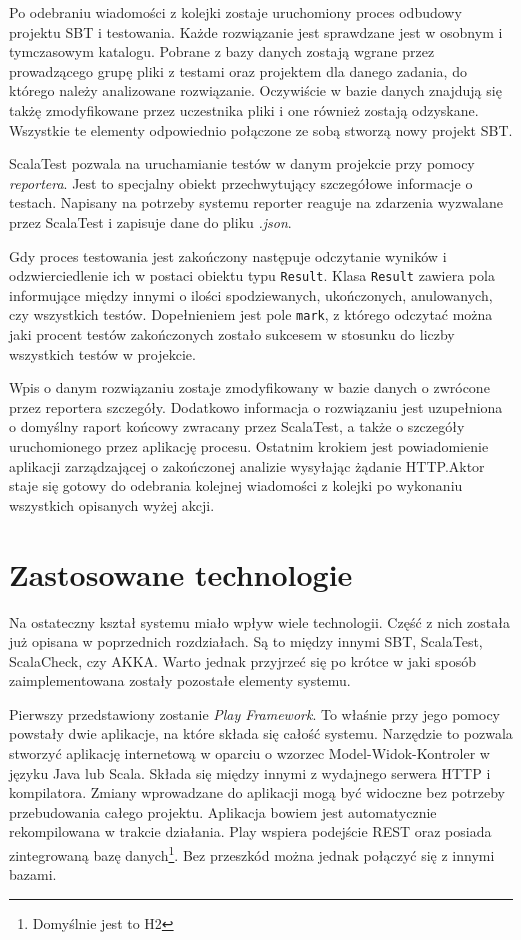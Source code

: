 \documentclass[brudnopis]{xmgr}
\begin{document}
Po odebraniu wiadomości z kolejki zostaje uruchomiony proces odbudowy projektu SBT i testowania. Każde rozwiązanie jest sprawdzane jest w osobnym i tymczasowym katalogu. Pobrane z bazy danych zostają wgrane przez prowadzącego grupę pliki z testami oraz projektem dla danego zadania, do którego należy analizowane rozwiązanie. Oczywiście w bazie danych znajdują się takżę zmodyfikowane przez uczestnika pliki i one również zostają odzyskane. Wszystkie te elementy odpowiednio połączone ze sobą stworzą nowy projekt SBT. 

ScalaTest pozwala na uruchamianie testów w danym projekcie przy pomocy \emph{reportera}. Jest to specjalny obiekt przechwytujący szczegółowe informacje o testach. Napisany na potrzeby systemu reporter reaguje na zdarzenia wyzwalane przez ScalaTest i zapisuje dane do pliku \emph{.json}. 

Gdy proces testowania jest zakończony następuje odczytanie wyników i odzwierciedlenie ich w postaci obiektu typu \texttt{Result}. Klasa \texttt{Result} zawiera pola informujące między innymi o ilości spodziewanych, ukończonych, anulowanych, czy wszystkich testów. Dopełnieniem jest pole \texttt{mark}, z którego odczytać można jaki procent testów zakończonych zostało sukcesem w stosunku do liczby wszystkich testów w projekcie. 

Wpis o danym rozwiązaniu zostaje zmodyfikowany w bazie danych o zwrócone przez reportera szczegóły. Dodatkowo informacja o rozwiązaniu jest uzupełniona o domyślny raport końcowy zwracany przez ScalaTest, a także o szczegóły uruchomionego przez aplikację procesu. Ostatnim krokiem jest powiadomienie aplikacji zarządzającej o zakończonej analizie wysyłając żądanie HTTP.Aktor staje się gotowy do odebrania kolejnej wiadomości z kolejki po wykonaniu wszystkich opisanych wyżej akcji.

\section{Zastosowane technologie}

Na ostateczny kształ systemu miało wpływ wiele technologii. Część z nich została już opisana w poprzednich rozdziałach. Są to między innymi SBT, ScalaTest, ScalaCheck, czy AKKA. Warto jednak przyjrzeć się po krótce w jaki sposób zaimplementowana zostały pozostałe elementy systemu. 

Pierwszy przedstawiony zostanie \emph{Play Framework}. To właśnie przy jego pomocy powstały dwie aplikacje, na które składa się całość systemu. Narzędzie to pozwala stworzyć aplikację internetową w oparciu o wzorzec Model-Widok-Kontroler w języku Java lub Scala. Składa się między innymi z wydajnego serwera HTTP i kompilatora. Zmiany wprowadzane do aplikacji mogą być widoczne bez potrzeby przebudowania całego projektu. Aplikacja bowiem jest automatycznie rekompilowana w trakcie działania. Play wspiera podejście REST oraz posiada zintegrowaną bazę danych\footnote{Domyślnie jest to H2}. Bez przeszkód można jednak połączyć się z innymi bazami. 
\end{document}
